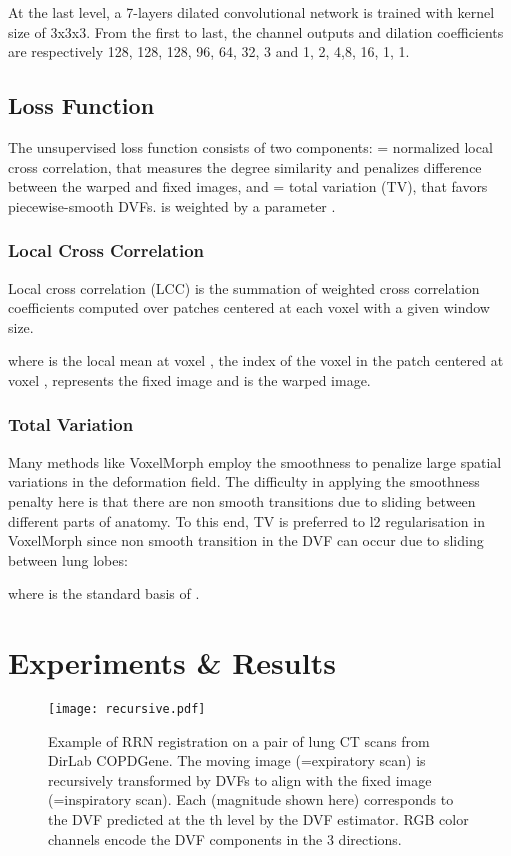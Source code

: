 \documentclass[runningheads]{llncs}
\begin{document}
At the last level, a 7-layers dilated convolutional network \cite{chenDeepLabSemanticImage2017} is trained with kernel size of 3x3x3. From the first to last, the channel outputs and dilation coefficients are respectively 128, 128, 128, 96, 64, 32, 3 and 1, 2, 4,8, 16, 1, 1. 

\subsection{Loss Function}
The unsupervised loss function consists  of two components:  = normalized local cross correlation, that measures the degree similarity and penalizes difference between the warped and fixed images, and = total variation (TV), that favors piecewise-smooth DVFs.  is weighted by a parameter . 


\subsubsection{Local Cross Correlation}
Local cross correlation (LCC) is the summation of weighted cross correlation coefficients computed over patches centered at each voxel with a given window size.


where  is the local mean at voxel ,  the index of the voxel in the patch centered at voxel ,  represents the fixed image and  is the warped image.

\subsubsection{Total Variation}
Many methods like VoxelMorph employ the smoothness to penalize large spatial variations in the deformation field. The difficulty in applying the smoothness penalty here is that there are non smooth transitions due to sliding between different parts of anatomy. To this end, TV is preferred to l2 regularisation in VoxelMorph since non smooth transition in the DVF can occur due to sliding between lung lobes:

where  is the standard basis of . 





\section{Experiments \& Results}
\begin{figure}[t]
\texttt{[image: recursive.pdf]}
\caption{Example of RRN registration on a pair of lung CT scans from DirLab COPDGene. The moving image (=expiratory scan) is recursively transformed by DVFs to align with the fixed image (=inspiratory scan). Each  (magnitude shown here) corresponds to the DVF predicted at the th level by the DVF estimator. RGB color channels encode the DVF components in the 3 directions.}\label{fig3}
\end{figure}
\end{document}
